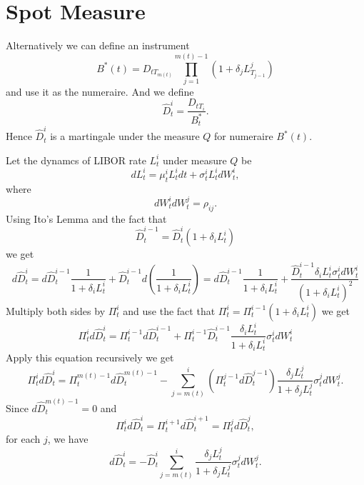 \section{Spot Measure}
Alternatively we can define an instrument
\begin{equation}
  B^*(t) = D_{tT_{m(t)}} \prod_{j=1}^{m(t)-1} (1+\delta_j L_{T_{j-1}}^j)
\end{equation}
and use it as the numeraire. And we define
\begin{equation}
  \hat{D}_t^i = \frac{D_{tT_i}}{B^*_t}.
\end{equation}
Hence $\hat{D}_t^i$ is a martingale under the measure $Q$ for numeraire
$B^*(t)$.

Let the dynamcs of LIBOR rate $L_t^i$ under measure $Q$ be
\begin{equation}
  dL_t^i = \mu_t^i L_t^i dt + \sigma_t^i L_t^i dW_t^i,
\end{equation}
where 
\begin{equation}
  dW_t^i dW_t^j = \rho_{ij}.
\end{equation}
Using Ito's Lemma and the fact that
\[
  \hat{D}_t^{i-1} = \hat{D}_t^{i} (1+\delta_i L_t^i)
\]
we get
\[
  d\hat{D}_t^{i} 
    = d\hat{D}_t^{i-1} \frac{1}{1+\delta_i L_t^i} 
      + \hat{D}_t^{i-1} d\left( \frac{1}{1+\delta_i L_t^i} \right)
    = d\hat{D}_t^{i-1} \frac{1}{1+\delta_i L_t^i} 
      + \frac{\hat{D}_t^{i-1} \delta_i L_t^i \sigma_t^i dW_t^i}{(1+\delta_i L_t^i)^2} 
\]
Multiply both sides by $\Pi_t^{i}$ and use the fact that
$\Pi_t^i=\Pi_t^{i-1} (1+\delta_i L_t^i)$ we get
\[
  \Pi_t^{i} d\hat{D}_t^{i} 
    = \Pi_t^{i-1} d\hat{D}_t^{i-1} 
      + \Pi_t^{i-1} \hat{D}_t^{i-1} \frac{\delta_i L_t^i}{1+\delta_i L_t^i} 
        \sigma_t^i dW_t^i
\]
Apply this equation recursively we get
\[
  \Pi_t^{i} d\hat{D}_t^{i} 
    = \Pi_t^{m(t)-1} d\hat{D}_t^{m(t)-1}
     -\sum_{j=m(t)}^i (\Pi_t^{j-1} d\hat{D}_t^{j-1}) 
       \frac{\delta_j L_t^j}{1+\delta_j L_t^j} \sigma_t^j dW_t^j.
\]
Since $d\hat{D}_t^{m(t)-1}=0$ and
\[
  \Pi_t^i d\hat{D}_t^{i}
    = \Pi_t^{i+1} d\hat{D}_t^{i+1}
    = \Pi_t^j d\hat{D}_t^{j},
\]
for each $j$, 
we have 
\begin{equation}
  d\hat{D}_t^{i} 
    = - \hat{D}_t^{i} \sum_{j=m(t)}^i
        \frac{\delta_j L_t^j}{1+\delta_j L_t^j} \sigma_t^j dW_t^j.
\end{equation}


